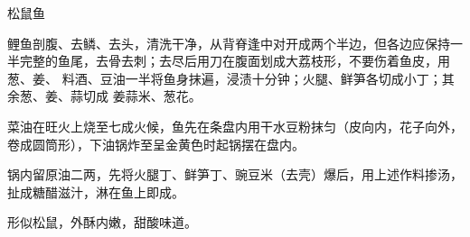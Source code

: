 %
%
%
%
%
%
%
\begin{recipe}{松鼠鱼}

\ingredients


\preparation

\step 鲤鱼剖腹、去鳞、去头，清洗干净，从背脊逢中对开成两个半边，但各边应保持一
半完整的鱼尾，去骨去刺；去尽后用刀在腹面划成大荔枝形，不要伤着鱼皮，用葱、姜、
料酒、豆油一半将鱼身抹遍，浸渍十分钟；火腿、鲜笋各切成小丁；其余葱、姜、蒜切成
姜蒜米、葱花。

\step 菜油在旺火上烧至七成火候，鱼先在条盘内用干水豆粉抹匀（皮向内，花子向外，
卷成圆筒形），下油锅炸至呈金黄色时起锅摆在盘内。

\step 锅内留原油二两，先将火腿丁、鲜笋丁、豌豆米（去壳）爆后，用上述作料掺汤，
扯成糖醋滋汁，淋在鱼上即成。

\features

形似松鼠，外酥内嫩，甜酸味道。

\end{recipe}

